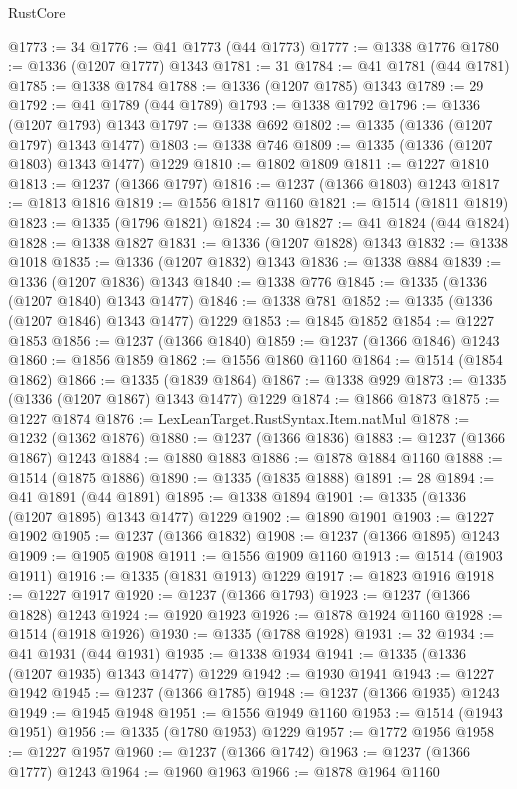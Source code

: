 \begin{lexlean}{RustCore}
\begin{coremodule}
@1773 := 34
@1776 := @41 @1773 (@44 @1773)
@1777 := @1338 @1776
@1780 := @1336 (@1207 @1777) @1343
@1781 := 31
@1784 := @41 @1781 (@44 @1781)
@1785 := @1338 @1784
@1788 := @1336 (@1207 @1785) @1343
@1789 := 29
@1792 := @41 @1789 (@44 @1789)
@1793 := @1338 @1792
@1796 := @1336 (@1207 @1793) @1343
@1797 := @1338 @692
@1802 := @1335 (@1336 (@1207 @1797) @1343 @1477)
@1803 := @1338 @746
@1809 := @1335 (@1336 (@1207 @1803) @1343 @1477) @1229
@1810 := @1802 @1809
@1811 := @1227 @1810
@1813 := @1237 (@1366 @1797)
@1816 := @1237 (@1366 @1803) @1243
@1817 := @1813 @1816
@1819 := @1556 @1817 @1160
@1821 := @1514 (@1811 @1819)
@1823 := @1335 (@1796 @1821)
@1824 := 30
@1827 := @41 @1824 (@44 @1824)
@1828 := @1338 @1827
@1831 := @1336 (@1207 @1828) @1343
@1832 := @1338 @1018
@1835 := @1336 (@1207 @1832) @1343
@1836 := @1338 @884
@1839 := @1336 (@1207 @1836) @1343
@1840 := @1338 @776
@1845 := @1335 (@1336 (@1207 @1840) @1343 @1477)
@1846 := @1338 @781
@1852 := @1335 (@1336 (@1207 @1846) @1343 @1477) @1229
@1853 := @1845 @1852
@1854 := @1227 @1853
@1856 := @1237 (@1366 @1840)
@1859 := @1237 (@1366 @1846) @1243
@1860 := @1856 @1859
@1862 := @1556 @1860 @1160
@1864 := @1514 (@1854 @1862)
@1866 := @1335 (@1839 @1864)
@1867 := @1338 @929
@1873 := @1335 (@1336 (@1207 @1867) @1343 @1477) @1229
@1874 := @1866 @1873
@1875 := @1227 @1874
@1876 := LexLeanTarget.RustSyntax.Item.natMul
@1878 := @1232 (@1362 @1876)
@1880 := @1237 (@1366 @1836)
@1883 := @1237 (@1366 @1867) @1243
@1884 := @1880 @1883
@1886 := @1878 @1884 @1160
@1888 := @1514 (@1875 @1886)
@1890 := @1335 (@1835 @1888)
@1891 := 28
@1894 := @41 @1891 (@44 @1891)
@1895 := @1338 @1894
@1901 := @1335 (@1336 (@1207 @1895) @1343 @1477) @1229
@1902 := @1890 @1901
@1903 := @1227 @1902
@1905 := @1237 (@1366 @1832)
@1908 := @1237 (@1366 @1895) @1243
@1909 := @1905 @1908
@1911 := @1556 @1909 @1160
@1913 := @1514 (@1903 @1911)
@1916 := @1335 (@1831 @1913) @1229
@1917 := @1823 @1916
@1918 := @1227 @1917
@1920 := @1237 (@1366 @1793)
@1923 := @1237 (@1366 @1828) @1243
@1924 := @1920 @1923
@1926 := @1878 @1924 @1160
@1928 := @1514 (@1918 @1926)
@1930 := @1335 (@1788 @1928)
@1931 := 32
@1934 := @41 @1931 (@44 @1931)
@1935 := @1338 @1934
@1941 := @1335 (@1336 (@1207 @1935) @1343 @1477) @1229
@1942 := @1930 @1941
@1943 := @1227 @1942
@1945 := @1237 (@1366 @1785)
@1948 := @1237 (@1366 @1935) @1243
@1949 := @1945 @1948
@1951 := @1556 @1949 @1160
@1953 := @1514 (@1943 @1951)
@1956 := @1335 (@1780 @1953) @1229
@1957 := @1772 @1956
@1958 := @1227 @1957
@1960 := @1237 (@1366 @1742)
@1963 := @1237 (@1366 @1777) @1243
@1964 := @1960 @1963
@1966 := @1878 @1964 @1160

\end{coremodule}
\end{lexlean}
